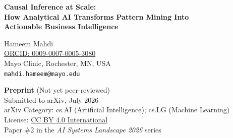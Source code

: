 \documentclass[12pt, a4paper]{article}
\begin{document}
\begin{center}
    {\Large\bfseries Causal Inference at Scale:\\[4pt]
    How Analytical AI Transforms Pattern Mining Into\\[2pt]
    Actionable Business Intelligence}

    \vspace{1em}

    {\large Hameem Mahdi}\\[2pt]
    {\small \href{https://orcid.org/0009-0007-0005-3080}{ORCID: 0009-0007-0005-3080}}\\[4pt]
    Mayo Clinic, Rochester, MN, USA\\
    \texttt{mahdi.hameem@mayo.edu}

    \vspace{1em}

    {\small\textbf{Preprint} (Not yet peer-reviewed)}\\[2pt]
    {\small Submitted to arXiv, July 2026}\\[2pt]
    {\small arXiv Category: cs.AI (Artificial Intelligence); cs.LG (Machine Learning)}\\[2pt]
    {\small License: \href{https://creativecommons.org/licenses/by/4.0/}{CC BY 4.0 International}}\\[2pt]
    {\small Paper \#2 in the \emph{AI Systems Landscape 2026} series}
\end{center}

\vspace{1em}
\end{document}
